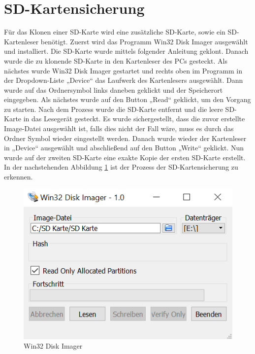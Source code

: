 \newpage
\section{SD-Kartensicherung}
Für das Klonen einer SD-Karte wird eine zusätzliche SD-Karte, sowie ein SD-Kartenleser benötigt. Zuerst wird das Programm Win32 Disk Imager ausgewählt und installiert. Die SD-Karte wurde mittels folgender Anleitung geklont. \parencite{SD-Kartenklonen}
Danach wurde die zu klonende SD-Karte in den Kartenleser des PCs gesteckt. Als nächstes wurde Win32 Disk Imager gestartet und rechts oben im Programm in der Dropdown-Liste „Device“ das Laufwerk des Kartenlesers ausgewählt. Dann wurde auf das Ordnersymbol links daneben geklickt und der Speicherort eingegeben. Als nächstes wurde auf den Button „Read“ geklickt, um den Vorgang zu starten. Nach dem Prozess wurde die SD-Karte entfernt und die leere SD-Karte in das Lesegerät gesteckt. Es wurde sichergestellt, dass die zuvor erstellte Image-Datei ausgewählt ist, falls dies nicht der Fall wäre, muss es durch das Ordner Symbol wieder eingestellt werden. Danach wurde wieder der Kartenleser in „Device“ ausgewählt und abschließend auf den Button „Write“ geklickt. Nun wurde auf der zweiten SD-Karte eine exakte Kopie der ersten SD-Karte erstellt. In der nachstehenden Abbildung \ref{fig:Win32 Disk Imager} ist der Prozess der SD-Kartensicherung zu erkennen.

\begin{figure}[H]
	\centering
	\includegraphics[width=0.5\linewidth]{images/Win32 Disk Imager.png}
	\caption[Win32 Disk Imager]{Win32 Disk Imager}
	\label{fig:Win32 Disk Imager}
\end{figure}

\newpage
